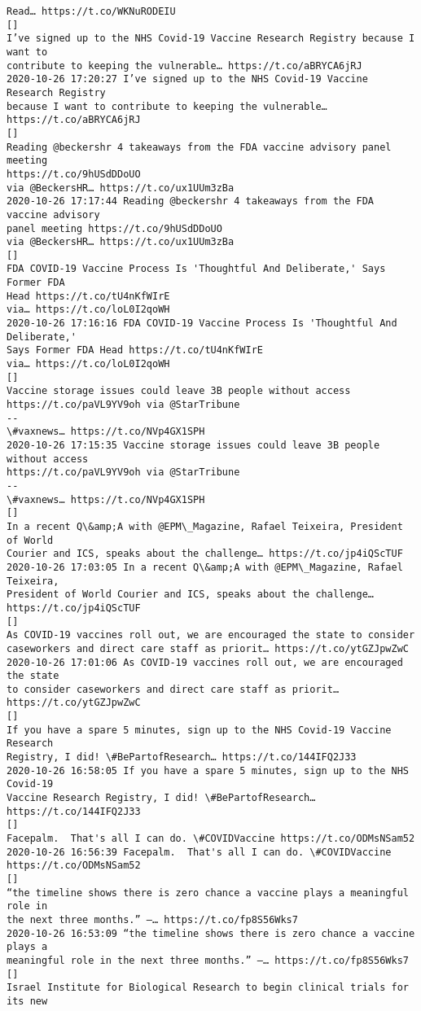\documentclass[11pt]{article}
\begin{document}
\begin{Verbatim}[commandchars=\\\{\}]
Read… https://t.co/WKNuRODEIU
[]
I’ve signed up to the NHS Covid-19 Vaccine Research Registry because I want to
contribute to keeping the vulnerable… https://t.co/aBRYCA6jRJ
2020-10-26 17:20:27 I’ve signed up to the NHS Covid-19 Vaccine Research Registry
because I want to contribute to keeping the vulnerable… https://t.co/aBRYCA6jRJ
[]
Reading @beckershr 4 takeaways from the FDA vaccine advisory panel meeting
https://t.co/9hUSdDDoUO
via @BeckersHR… https://t.co/ux1UUm3zBa
2020-10-26 17:17:44 Reading @beckershr 4 takeaways from the FDA vaccine advisory
panel meeting https://t.co/9hUSdDDoUO
via @BeckersHR… https://t.co/ux1UUm3zBa
[]
FDA COVID-19 Vaccine Process Is 'Thoughtful And Deliberate,' Says Former FDA
Head https://t.co/tU4nKfWIrE
via… https://t.co/loL0I2qoWH
2020-10-26 17:16:16 FDA COVID-19 Vaccine Process Is 'Thoughtful And Deliberate,'
Says Former FDA Head https://t.co/tU4nKfWIrE
via… https://t.co/loL0I2qoWH
[]
Vaccine storage issues could leave 3B people without access
https://t.co/paVL9YV9oh via @StarTribune
--
\#vaxnews… https://t.co/NVp4GX1SPH
2020-10-26 17:15:35 Vaccine storage issues could leave 3B people without access
https://t.co/paVL9YV9oh via @StarTribune
--
\#vaxnews… https://t.co/NVp4GX1SPH
[]
In a recent Q\&amp;A with @EPM\_Magazine, Rafael Teixeira, President of World
Courier and ICS, speaks about the challenge… https://t.co/jp4iQScTUF
2020-10-26 17:03:05 In a recent Q\&amp;A with @EPM\_Magazine, Rafael Teixeira,
President of World Courier and ICS, speaks about the challenge…
https://t.co/jp4iQScTUF
[]
As COVID-19 vaccines roll out, we are encouraged the state to consider
caseworkers and direct care staff as priorit… https://t.co/ytGZJpwZwC
2020-10-26 17:01:06 As COVID-19 vaccines roll out, we are encouraged the state
to consider caseworkers and direct care staff as priorit…
https://t.co/ytGZJpwZwC
[]
If you have a spare 5 minutes, sign up to the NHS Covid-19 Vaccine Research
Registry, I did! \#BePartofResearch… https://t.co/144IFQ2J33
2020-10-26 16:58:05 If you have a spare 5 minutes, sign up to the NHS Covid-19
Vaccine Research Registry, I did! \#BePartofResearch… https://t.co/144IFQ2J33
[]
Facepalm.  That's all I can do. \#COVIDVaccine https://t.co/ODMsNSam52
2020-10-26 16:56:39 Facepalm.  That's all I can do. \#COVIDVaccine
https://t.co/ODMsNSam52
[]
“the timeline shows there is zero chance a vaccine plays a meaningful role in
the next three months.” —… https://t.co/fp8S56Wks7
2020-10-26 16:53:09 “the timeline shows there is zero chance a vaccine plays a
meaningful role in the next three months.” —… https://t.co/fp8S56Wks7
[]
Israel Institute for Biological Research to begin clinical trials for its new

\end{Verbatim}
\end{document}
